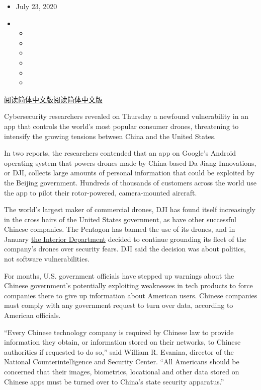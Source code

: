 \begin{itemize}
\item
  July 23, 2020
\item
  \begin{itemize}
  \item
  \item
  \item
  \item
  \item
  \item
  \end{itemize}
\end{itemize}

\href{https://cn.nytimes.com/usa/20200724/dji-drones-security-vulnerability/}{阅读简体中文版}\href{https://cn.nytimes.com/usa/20200724/dji-drones-security-vulnerability/}{阅读简体中文版}

Cybersecurity researchers revealed on Thursday a newfound vulnerability
in an app that controls the world's most popular consumer drones,
threatening to intensify the growing tensions between China and the
United States.

In two reports, the researchers contended that an app on Google's
Android operating system that powers drones made by China-based Da Jiang
Innovations, or DJI, collects large amounts of personal information that
could be exploited by the Beijing government. Hundreds of thousands of
customers across the world use the app to pilot their rotor-powered,
camera-mounted aircraft.

The world's largest maker of commercial drones, DJI has found itself
increasingly in the cross hairs of the United States government, as have
other successful Chinese companies. The Pentagon has banned the use of
its drones, and in January
\href{https://www.nytimes.com/2020/01/29/technology/interior-chinese-drones.html}{the
Interior Department} decided to continue grounding its fleet of the
company's drones over security fears. DJI said the decision was about
politics, not software vulnerabilities.

For months, U.S. government officials have stepped up warnings about the
Chinese government's potentially exploiting weaknesses in tech products
to force companies there to give up information about American users.
Chinese companies must comply with any government request to turn over
data, according to American officials.

``Every Chinese technology company is required by Chinese law to provide
information they obtain, or information stored on their networks, to
Chinese authorities if requested to do so,'' said William R. Evanina,
director of the National Counterintelligence and Security Center. ``All
Americans should be concerned that their images, biometrics, locational
and other data stored on Chinese apps must be turned over to China's
state security apparatus.''


